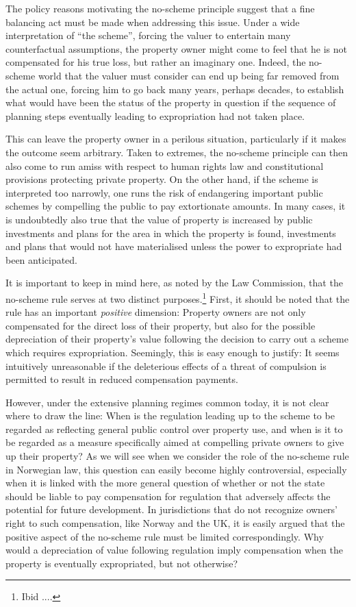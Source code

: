The policy reasons motivating the no-scheme principle suggest that a fine balancing act must be made when addressing this issue. Under a wide interpretation of ``the scheme'', forcing the valuer to entertain many counterfactual assumptions, the property owner might come to feel that he is not compensated for his true loss, but rather an imaginary one. Indeed, the no-scheme world that the valuer must consider can end up being far removed from the actual one, forcing him to go back many years, perhaps decades, to establish what would have been the status of the property in question if the sequence of planning steps eventually leading to expropriation had not taken place. 

This can leave the property owner in a perilous situation, particularly if it makes the outcome seem arbitrary. Taken to extremes, the no-scheme principle can then also come to run amiss with respect to human rights law and constitutional provisions protecting private property. On the other hand, if the scheme is interpreted too narrowly, one runs the risk of endangering important public schemes by compelling the public to pay extortionate amounts. In many cases, it is undoubtedly also true that the value of property is increased by public investments and plans for the area in which the property is found, investments and plans that would not have materialised unless the power to expropriate had been anticipated.

It is important to keep in mind here, as noted by the Law Commission, that the no-scheme rule serves at two distinct purposes.\footnote{Ibid ....} First, it should be noted that the rule has an important \emph{positive} dimension: Property owners are not only compensated for the direct loss of their property, but also for the possible depreciation of their property's value following the decision to carry out a scheme which requires expropriation. Seemingly, this is easy enough to justify: It seems intuitively unreasonable if the deleterious effects of a threat of compulsion is permitted to result in reduced compensation payments.

However, under the extensive planning regimes common today, it is not clear where to draw the line: When is the regulation leading up to the scheme to be regarded as reflecting general public control over property use, and when is it to be regarded as a measure specifically aimed at compelling private owners to give up their property? As we will see when we consider the role of the no-scheme rule in Norwegian law, this question can easily become highly controversial, especially when it is linked with the more general question of whether or not the state should be liable to pay compensation for regulation that adversely affects the potential for future development. In jurisdictions that do not recognize owners' right to such compensation, like Norway and the UK, it is easily argued that the positive aspect of the no-scheme rule must be limited correspondingly. Why would a depreciation of value following regulation imply compensation when the property is eventually expropriated, but not otherwise?


